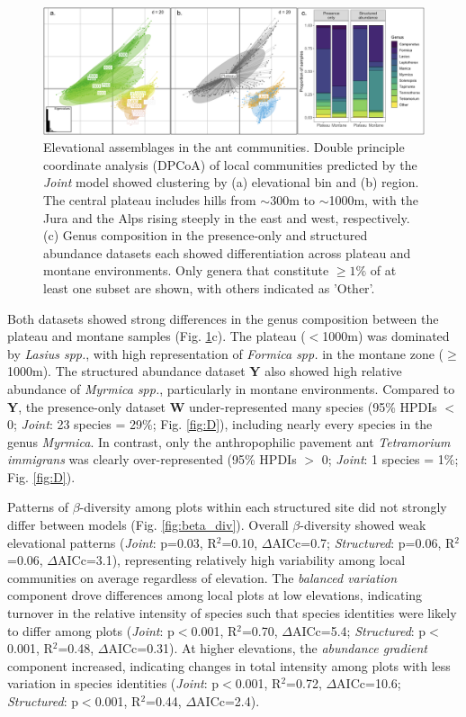 \documentclass[preprint,final,times,12pt,3p]{elsarticle}
\begin{document}
\begin{figure}
	\centering\includegraphics[width=\textwidth]{../../../ms/1_Ecography/1/figs/DPCoA_assemblage.png}
	\caption{\label{fig:DPCoA_assemblages} Elevational assemblages in the ant communities. Double principle coordinate analysis (DPCoA) of local communities predicted by the \emph{Joint} model showed clustering by (a) elevational bin and (b) region. The central plateau includes hills from $\sim$300m to $\sim$1000m, with the Jura and the Alps rising steeply in the east and west, respectively. (c) Genus composition in the presence-only and structured abundance datasets each showed differentiation across plateau and montane environments. Only genera that constitute $\geq 1\%$ of at least one subset are shown, with others indicated as 'Other'.}
\end{figure}

Both datasets showed strong differences in the genus composition between the plateau and montane samples (Fig. \ref{fig:DPCoA_assemblages}c). The plateau ($<$1000m) was dominated by \emph{Lasius spp.}, with high representation of \emph{Formica spp.} in the montane zone ($\geq$1000m). The structured abundance dataset \textbf{Y} also showed high relative abundance of \emph{Myrmica spp.}, particularly in montane environments. Compared to \textbf{Y}, the presence-only dataset \textbf{W} under-represented many species (95\% HPDIs $<$ 0; \emph{Joint}: 23 species = 29\%; Fig. \ref{fig:D}), including nearly every species in the genus \emph{Myrmica}. In contrast, only the anthropophilic pavement ant \emph{Tetramorium immigrans} was clearly over-represented (95\% HPDIs $>$ 0; \emph{Joint}: 1 species = 1\%; Fig. \ref{fig:D}). 

Patterns of $\beta$-diversity among plots within each structured site did not strongly differ between models (Fig. \ref{fig:beta_div}). Overall $\beta$-diversity showed weak elevational patterns (\emph{Joint}: p=0.03, R$^2$=0.10, $\Delta$AICc=0.7; \emph{Structured}: p=0.06, R$^2$=0.06, $\Delta$AICc=3.1), representing relatively high variability among local communities on average regardless of elevation. The \emph{balanced variation} component drove differences among local plots at low elevations, indicating turnover in the relative intensity of species such that species identities were likely to differ among plots (\emph{Joint}: p$<$0.001, R$^2$=0.70, $\Delta$AICc=5.4; \emph{Structured}: p$<$0.001, R$^2$=0.48, $\Delta$AICc=0.31). At higher elevations, the \emph{abundance gradient} component increased, indicating changes in total intensity among plots with less variation in species identities (\emph{Joint}: p$<$0.001, R$^2$=0.72, $\Delta$AICc=10.6; \emph{Structured}: p$<$0.001, R$^2$=0.44, $\Delta$AICc=2.4). 
\end{document}
